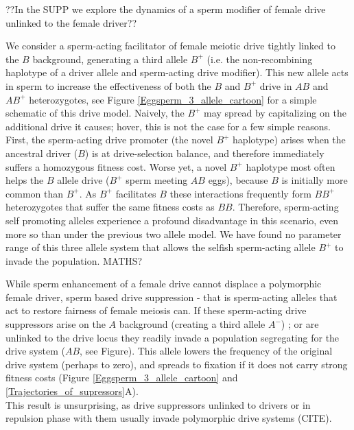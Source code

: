 \documentclass[12pt,letterpaper]{article}
\newcommand{\yb}[1]{{ \color{blue} #1}}
\begin{document}
\yb{??In the SUPP we explore the dynamics of a sperm modifier of female drive unlinked to the female driver??} 


We consider a sperm-acting facilitator of
	female meiotic drive tightly linked to the $B$ background, 
	generating a third allele $B^{+}$ (i.e. the non-recombining haplotype of a
        driver allele and sperm-acting drive modifier). 
This new allele acts in sperm to increase the effectiveness of both
	the $B$ and  $B^{+}$ drive in $AB$ and $AB^{+}$ heterozygotes, see Figure \ref{Eggsperm_3_allele_cartoon} 
	for a simple schematic of this drive model.  
Naively, the $B^{+}$ may spread by capitalizing on the additional drive it causes; hover,  
	this is not the case for a few simple reasons. 
First, the sperm-acting drive promoter (the novel $B^{+}$ haplotype) 
	arises when the ancestral driver ($B$) is at drive-selection balance, 
	and therefore immediately suffers a homozygous fitness cost.  
Worse yet, a novel $B^{+}$ haplotype most often helps 
	the $B$  allele drive ($B^+$ sperm meeting $AB$ eggs), because $B$ is initially more common than $B^{+}$. 
As $B^{+}$ facilitates $B$ these interactions frequently form 
	$BB^{+}$ heterozygotes that suffer the same fitness costs as $BB$. 
Therefore, sperm-acting self promoting alleles experience a profound disadvantage
	in this scenario, even more so than under the previous two allele model. 
We have found no parameter range of this
	three allele system that allows the selfish sperm-acting allele $B^{+}$ to
	invade the population. \yb{MATHS?}

While  sperm enhancement of a female drive cannot displace a polymorphic female driver, sperm based drive suppression - 
	that is sperm-acting alleles that act to restore 
	fairness of female meiosis can. 
If these sperm-acting drive suppressors arise on
	the $A$ background (creating a third allele $A^{-}$) ;
	or are unlinked to the drive locus they readily invade a population segregating
	for the drive system ($AB$, see Figure). 
This allele lowers the frequency of the original drive system (perhaps to zero),
	and spreads to fixation if it does not carry strong fitness costs
	(Figure \ref{Eggsperm_3_allele_cartoon} and \ref{Trajectories_of_supressors}A). \\
\yb{This result is unsurprising, as drive suppressors unlinked to drivers or in repulsion phase with them usually invade polymorphic drive systems (CITE).}  
\end{document}
